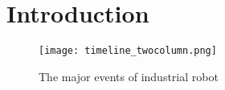 \documentclass[main.tex]{subfiles}
\begin{document}
\section{Introduction}

\lipsum[1-2]

\begin{figure}[h]
    \centering
    \texttt{[image: timeline\_twocolumn.png]}
    \caption{The major events of industrial robot \cite{IFRtimeline}\cite{futura}}
    \label{timeline}
\end{figure}

\lipsum[1]
\end{document}

